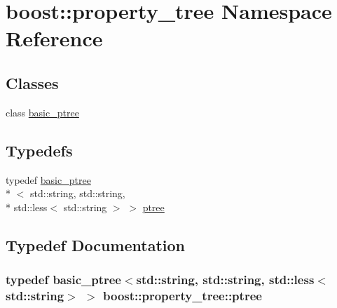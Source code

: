 \hypertarget{namespaceboost_1_1property__tree}{\section{boost\-:\-:property\-\_\-tree Namespace Reference}
\label{namespaceboost_1_1property__tree}
}
\subsection*{Classes}
\begin{DoxyCompactItemize}
\item 
class \hyperlink{classboost_1_1property__tree_1_1basic__ptree}{basic\-\_\-ptree}
\end{DoxyCompactItemize}
\subsection*{Typedefs}
\begin{DoxyCompactItemize}
\item 
typedef \hyperlink{classboost_1_1property__tree_1_1basic__ptree}{basic\-\_\-ptree}\\*
$<$ std\-::string, std\-::string, \\*
std\-::less$<$ std\-::string $>$ $>$ \hyperlink{namespaceboost_1_1property__tree_aed170f35c6e34bdf310d34c11915b136}{ptree}
\end{DoxyCompactItemize}


\subsection{Typedef Documentation}
\hypertarget{namespaceboost_1_1property__tree_aed170f35c6e34bdf310d34c11915b136}{
\subsubsection[{ptree}]{\setlength{\rightskip}{0pt plus 5cm}typedef {\bf basic\-\_\-ptree}$<$std\-::string, std\-::string, std\-::less$<$std\-::string$>$ $>$ {\bf boost\-::property\-\_\-tree\-::ptree}}}\label{namespaceboost_1_1property__tree_aed170f35c6e34bdf310d34c11915b136}
